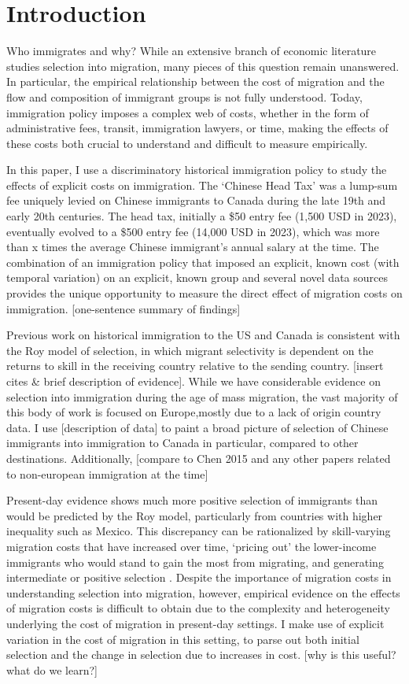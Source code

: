 \section{Introduction}
Who immigrates and why? While an extensive branch of economic literature studies selection into migration, many pieces of this question remain unanswered. In particular, the empirical relationship between the cost of migration and the flow and composition of immigrant groups is not fully understood. Today, immigration policy imposes a complex web of costs, whether in the form of administrative fees, transit, immigration lawyers, or time, making the effects of these costs both crucial to understand and difficult to measure empirically. 

In this paper, I use a discriminatory historical immigration policy to study the effects of explicit costs on immigration. The `Chinese Head Tax' was a lump-sum fee uniquely levied on Chinese immigrants to Canada during the late 19th and early 20th centuries. The head tax, initially a \$50 entry fee (1,500 USD in 2023), eventually evolved to a \$500 entry fee (14,000 USD in 2023), which was more than x times the average Chinese immigrant's annual salary at the time. The combination of an immigration policy that imposed an explicit, known cost (with temporal variation) on an explicit, known group and several novel data sources provides the unique opportunity to measure the direct effect of migration costs on immigration. [one-sentence summary of findings]

Previous work on historical immigration to the US and Canada is consistent with the Roy model of selection, in which migrant selectivity is dependent on the returns to skill in the receiving country relative to the sending country. [insert cites \& brief description of evidence]. While we have considerable evidence on selection into immigration during the age of mass migration, the vast majority of this body of work is focused on Europe,mostly due to a lack of origin country data. I use [description of data] to paint a broad picture of selection of Chinese immigrants into immigration to Canada in particular, compared to other destinations. Additionally, [compare to Chen 2015 and any other papers related to non-european immigration at the time] 

Present-day evidence shows much more positive selection of immigrants than would be predicted by the Roy model, particularly from countries with higher inequality such as Mexico. This discrepancy can be rationalized by skill-varying migration costs that have increased over time, `pricing out' the lower-income immigrants who would stand to gain the most from migrating, and generating intermediate or positive selection \citep{chiquiarhanson2005, mckenzierapoport2010}. 
Despite the importance of migration costs in understanding selection into migration, however, empirical evidence on the effects of migration costs is difficult to obtain due to the complexity and heterogeneity underlying the cost of migration in present-day settings. I make use of explicit variation in the cost of migration in this setting, to parse out both initial selection and the change in selection due to increases in cost. [why is this useful? what do we learn?]

